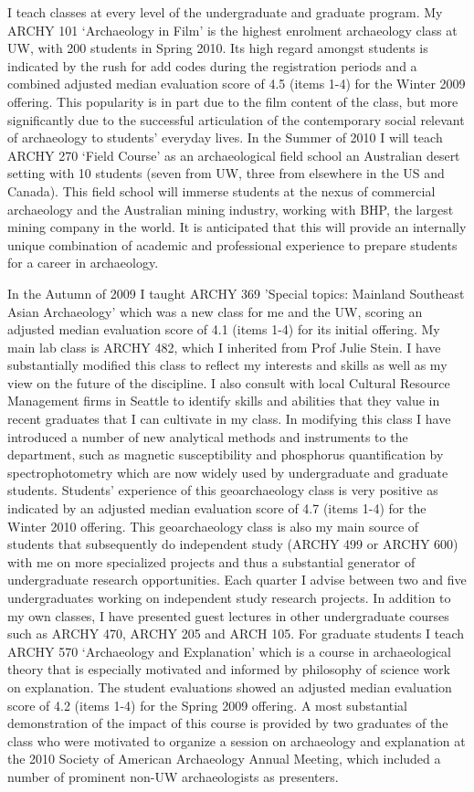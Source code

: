 \documentclass[11pt,article,oneside]{memoir}
\begin{document}
I teach classes at every level of the undergraduate and graduate program. My ARCHY 101 ‘Archaeology in Film’ is the highest enrolment archaeology class at UW, with 200 students in Spring 2010. Its high regard amongst students is indicated by the rush for add codes during the registration periods and a combined adjusted median evaluation score of 4.5 (items 1-4) for the Winter 2009 offering. This popularity is in part due to the film content of the class, but more significantly due to the successful articulation of the contemporary social relevant of archaeology to students’ everyday lives. In the Summer of 2010 I will teach ARCHY 270 ‘Field Course’ as an archaeological field school an Australian desert setting with 10 students (seven from UW, three from elsewhere in the US and Canada). This field school will immerse students at the nexus of commercial archaeology and the Australian mining industry, working with BHP, the largest mining company in the world. It is anticipated that this will provide an internally unique combination of academic and professional experience to prepare students for a career in archaeology. 

In the Autumn of 2009 I taught ARCHY 369 ’Special topics: Mainland Southeast Asian Archaeology’ which was a new class for me and the UW, scoring an adjusted median evaluation score of 4.1 (items 1-4) for its initial offering. My main lab class is ARCHY 482, which I inherited from Prof Julie Stein. I have substantially modified this class to reflect my interests and skills as well as my view on the future of the discipline. I also consult with local Cultural Resource Management firms in Seattle to identify skills and abilities that they value in recent graduates that I can cultivate in my class. In modifying this class I have introduced a number of new analytical methods and instruments to the department, such as magnetic susceptibility and phosphorus quantification by spectrophotometry which are now widely used by undergraduate and graduate students. Students’ experience of this geoarchaeology class is very positive as indicated by an adjusted median evaluation score of 4.7 (items 1-4) for the Winter 2010 offering. This geoarchaeology class is also my main source of students that subsequently do independent study (ARCHY 499 or ARCHY 600) with me on more specialized projects and thus a substantial generator of undergraduate research opportunities. Each quarter I advise between two and five undergraduates working on independent study research projects. In addition to my own classes, I have presented guest lectures in other undergraduate courses such as ARCHY 470, ARCHY 205 and ARCH 105. For graduate students I teach ARCHY 570 ‘Archaeology and Explanation’ which is a course in archaeological theory that is especially motivated and informed by philosophy of science work on explanation. The student evaluations showed an adjusted median evaluation score of 4.2 (items 1-4) for the Spring 2009 offering. A most substantial demonstration of the impact of this course is provided by two graduates of the class who were motivated to organize a session on archaeology and explanation at the 2010 Society of American Archaeology Annual Meeting, which included a number of prominent non-UW archaeologists as presenters. 
\end{document}

